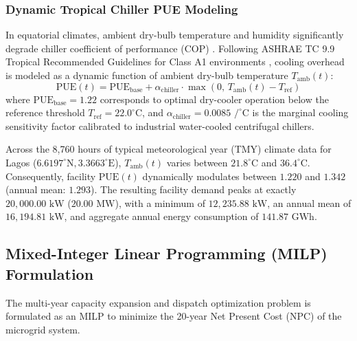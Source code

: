 \documentclass[12pt,3p,review]{elsarticle}
\begin{document}
\subsubsection{Dynamic Tropical Chiller PUE Modeling}
In equatorial climates, ambient dry-bulb temperature and humidity significantly degrade chiller coefficient of performance (COP) \cite{Yu2021}. Following ASHRAE TC 9.9 Tropical Recommended Guidelines for Class A1 environments \cite{ASHRAE2021}, cooling overhead is modeled as a dynamic function of ambient dry-bulb temperature $T_{\text{amb}}(t)$:
\begin{equation}
    \text{PUE}(t) = \text{PUE}_{\text{base}} + \alpha_{\text{chiller}} \cdot \max\left(0, \, T_{\text{amb}}(t) - T_{\text{ref}}\right)
    \label{eq:pue}
\end{equation}
where $\text{PUE}_{\text{base}} = 1.22$ corresponds to optimal dry-cooler operation below the reference threshold $T_{\text{ref}} = 22.0^\circ\text{C}$, and $\alpha_{\text{chiller}} = 0.0085\text{ /}^\circ\text{C}$ is the marginal cooling sensitivity factor calibrated to industrial water-cooled centrifugal chillers. 

Across the 8,760 hours of typical meteorological year (TMY) climate data for Lagos ($6.6197^\circ\text{N}, 3.3663^\circ\text{E}$), $T_{\text{amb}}(t)$ varies between $21.8^\circ\text{C}$ and $36.4^\circ\text{C}$. Consequently, facility $\text{PUE}(t)$ dynamically modulates between $1.220$ and $1.342$ (annual mean: $1.293$). The resulting facility demand peaks at exactly $20,000.00\text{ kW}$ ($20.00\text{ MW}$), with a minimum of $12,235.88\text{ kW}$, an annual mean of $16,194.81\text{ kW}$, and aggregate annual energy consumption of $141.87\text{ GWh}$.

\subsection{Mixed-Integer Linear Programming (MILP) Formulation}

The multi-year capacity expansion and dispatch optimization problem is formulated as an MILP to minimize the 20-year Net Present Cost ($\text{NPC}$) of the microgrid system.
\end{document}
